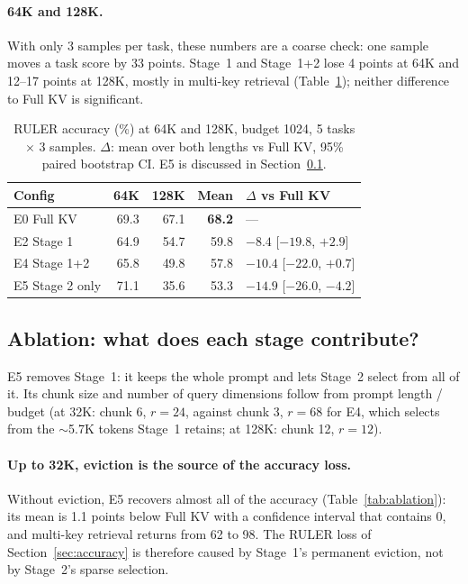 \documentclass[10pt,letterpaper]{article}
\newcommand{\best}[1]{\textbf{#1}}
\begin{document}
\paragraph{64K and 128K.}
With only 3 samples per task, these numbers are a coarse check: one sample moves a task score by 33 points. Stage~1 and Stage~1+2 lose 4 points at 64K and 12--17 points at 128K, mostly in multi-key retrieval (Table~\ref{tab:long}); neither difference to Full KV is significant.

\begin{table}[h]
\centering\small
\caption{RULER accuracy (\%) at 64K and 128K, budget 1024, 5 tasks $\times$ 3 samples. $\Delta$: mean over both lengths vs Full KV, 95\% paired bootstrap CI. E5 is discussed in Section~\ref{sec:ablation}.}
\label{tab:long}
\begin{tabular}{lrrrl}
\toprule
Config & 64K & 128K & Mean & $\Delta$ vs Full KV \\
\midrule
E0 Full KV & 69.3 & 67.1 & \best{68.2} & --- \\
E2 Stage 1 & 64.9 & 54.7 & 59.8 & $-8.4$ [$-19.8$, $+2.9$] \\
E4 Stage 1+2 & 65.8 & 49.8 & 57.8 & $-10.4$ [$-22.0$, $+0.7$] \\
E5 Stage 2 only & 71.1 & 35.6 & 53.3 & $-14.9$ [$-26.0$, $-4.2$] \\
\bottomrule
\end{tabular}
\end{table}

\subsection{Ablation: what does each stage contribute?}
\label{sec:ablation}

E5 removes Stage~1: it keeps the whole prompt and lets Stage~2 select from all of it. Its chunk size and number of query dimensions follow from prompt length / budget (at 32K: chunk 6, $r = 24$, against chunk 3, $r = 68$ for E4, which selects from the $\sim$5.7K tokens Stage~1 retains; at 128K: chunk 12, $r = 12$).

\paragraph{Up to 32K, eviction is the source of the accuracy loss.}
Without eviction, E5 recovers almost all of the accuracy (Table~\ref{tab:ablation}): its mean is 1.1 points below Full KV with a confidence interval that contains 0, and multi-key retrieval returns from 62 to 98. The RULER loss of Section~\ref{sec:accuracy} is therefore caused by Stage~1's permanent eviction, not by Stage~2's sparse selection.
\end{document}
